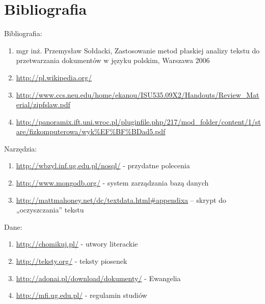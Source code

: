 \documentclass[a4paper]{article}
\begin{document}
\newpage
\section{Bibliografia}

\hspace{15px}Bibliografia:
\begin{enumerate}

\item mgr inż. Przemysław Sołdacki, Zastosowanie metod płaskiej analizy tekstu do przetwarzania dokumentów w języku polskim, Warszawa 2006
\item \url{http://pl.wikipedia.org/}
\item \url{http://www.ccs.neu.edu/home/ekanou/ISU535.09X2/Handouts/Review_Material/zipfslaw.pdf}
\item \url{http://panoramix.ift.uni.wroc.pl/pluginfile.php/217/mod_folder/content/1/stare/fizkomputerowa/wyk%EF%BF%BDad5.pdf}

\end{enumerate}

Narzędzia:
\begin{enumerate}
\item \url{http://wbzyl.inf.ug.edu.pl/nosql/} - przydatne polecenia 
\item \url{http://www.mongodb.org/} -  system zarządzania bazą danych
\item \url{http://mattmahoney.net/dc/textdata.html#appendixa} – skrypt do „oczyszczania” tekstu 
\end{enumerate}

Dane:
\begin{enumerate}
	\item  \url{http://chomikuj.pl/} - utwory literackie
	\item  \url{http://teksty.org/}  - teksty piosenek
	\item  \url{http://adonai.pl/download/dokumenty/} - Ewangelia
	\item  \url{http://mfi.ug.edu.pl/} - regulamin studiów 
\end{enumerate}
\end{document}
